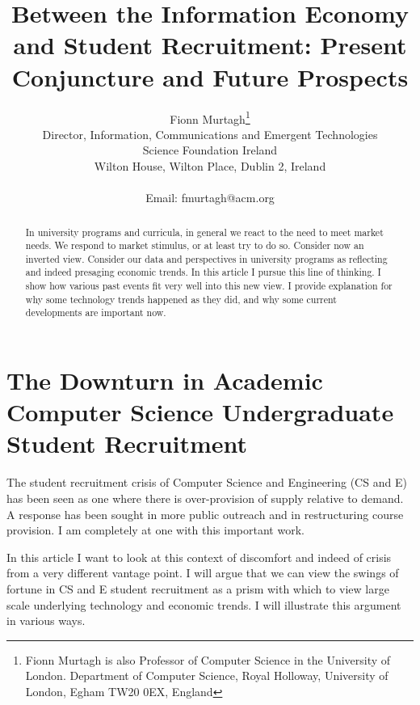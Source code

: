 \documentclass{article}
\begin{document}
\title{Between the Information Economy and 
Student Recruitment: Present Conjuncture and Future Prospects}

\author{Fionn Murtagh\footnote{Fionn Murtagh is also Professor of 
Computer Science in 
the University of London.  
Department of Computer Science,
Royal Holloway, University of London,
Egham TW20 0EX, England}
\\
Director, Information, Communications and Emergent Technologies\\
Science Foundation Ireland \\
Wilton House, Wilton Place, Dublin 2, Ireland \\
 \\
Email: fmurtagh@acm.org}

\maketitle

\begin{abstract}
In university programs and curricula, in general we react to the
need to meet market needs.  We respond to market stimulus, or 
at least try to do so.  Consider now an inverted view.  Consider
our data and perspectives in university programs as reflecting 
and indeed presaging economic trends.  In this article I pursue 
this line of thinking.  I show how various past events fit very 
well into this new view.
I provide explanation for why some technology trends 
happened as they did,
and why some current developments are important now.  
\end{abstract}

\section{The Downturn in Academic Computer Science Undergraduate 
Student Recruitment}

The student recruitment crisis of Computer Science and 
Engineering (CS and E)  has been seen 
as one where there is over-provision 
of supply relative to demand.   A response has 
been sought in more public 
outreach and in restructuring course provision.  I am 
completely at one with this 
important work.  

In this article I want to look at this 
context of discomfort and indeed 
of crisis from a very different vantage point.  I will 
argue that we can view the swings 
of fortune in CS and E student recruitment as a prism with 
which to view large scale underlying technology and economic trends.  
I will illustrate this argument in various 
ways.  
\end{document}
